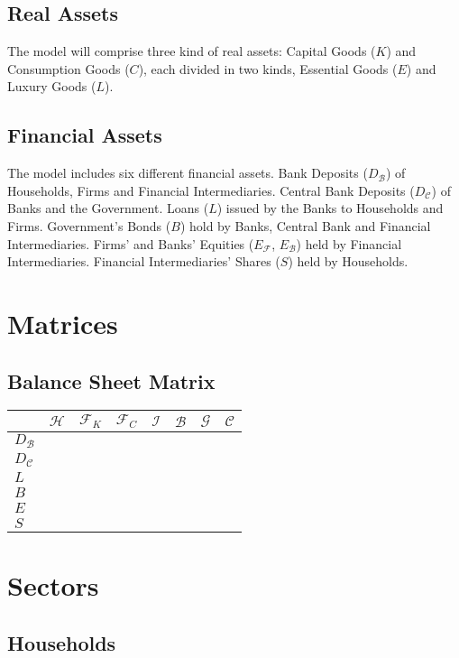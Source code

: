 \documentclass[a4paper, headings=standardclasses]{scrartcl}
\begin{document}
\subsection{Real Assets}
The model will comprise three kind of real assets: Capital Goods ($K$) and Consumption Goods ($C$), each divided in two kinds, Essential Goods ($E$) and Luxury Goods ($L$).

\subsection{Financial Assets}
The model includes six different financial assets. 
Bank Deposits ($D_\mathcal{B}$) of Households, Firms and Financial Intermediaries. 
Central Bank Deposits ($D_\mathcal{C}$) of Banks and the Government. 
Loans ($L$) issued by the Banks to Households and Firms. Government's Bonds ($B$) hold by Banks, Central Bank and Financial Intermediaries. 
Firms' and Banks' Equities ($E_\mathcal{F}$, $E_\mathcal{B}$) held by Financial Intermediaries.
Financial Intermediaries' Shares ($S$) held by Households.

\section{Matrices}
\subsection{Balance Sheet Matrix}

\begin{tabular}{|l|ccccccc|}
	\toprule
	& $\mathcal{H}$ & $\mathcal{F}_K$ & $\mathcal{F}_C$ & $\mathcal{I}$ & $\mathcal{B}$ & $\mathcal{G}$ & $\mathcal{C}$ \\
	\midrule
	$D_\mathcal{B}$ &&&&&&&\\
	$D_\mathcal{C}$ &&&&&&&\\
	$L$ &&&&&&&\\
	$B$ &&&&&&&\\
	$E$ &&&&&&&\\
	$S$ &&&&&&&\\
	\bottomrule
\end{tabular}

\section{Sectors}
\subsection{Households}
\end{document}
